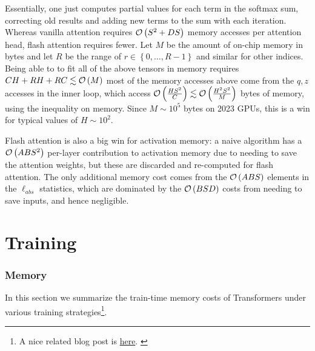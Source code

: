 \documentclass[11pt]{article}
\begin{document}
Essentially, one just computes partial values for each term in the softmax sum, correcting old
results and adding new terms to the sum with each iteration. Whereas vanilla attention requires $
\mathcal{O} \left( S ^{ 2 }+ DS \right)  $ memory accesses per attention head, flash attention requires
fewer. Let $ M $ be the amount of on-chip memory in bytes and let $ R  $ be the range of $ r \in
\left \{ 0, \ldots , R-1 \right \} $ and similar for other indices. Being able to to fit all of the
above tensors in memory requires $ CH + RH + RC \lesssim \mathcal{O} \left( M \right)  $ most of the memory
accesses above come from the $ q, z $ accesses in the inner loop, which access $ \mathcal{O} \left( \frac{
HS ^{ 2 } }{ C } \right)  \lesssim \mathcal{O} \left(\frac{ H ^{ 2}S ^{ 2 } }{ M }  \right) $ bytes of
memory, using the inequality on memory. Since $ M \sim 10 ^{ 5 } $ bytes on 2023 GPUs, this is a win
for typical values of $ H \sim 10 ^{ 2 } $.


Flash attention is also a big win for activation memory: a naive algorithm has a $ \mathcal{O} \left( ABS
^{ 2 } \right)  $ per-layer contribution to activation memory due to needing to save the attention
weights, but these are discarded and re-computed for flash attention.  The only additional memory
cost comes from the $ \mathcal{O} \left( ABS \right)  $ elements in the $ \ell _{ abs } $ statistics, which are
dominated by the $ \mathcal{O} \left( BSD \right)  $ costs from needing to save inputs, and hence negligible.

\newpage

\part{Training}

\section{Memory \label{sec_memory_training}}

In this section we summarize the train-time memory costs of Transformers under various training
strategies\footnote{A nice related blog post is \href{https://blog.eleuther.ai/transformer-math/}{here}. \label{foot_eleuther_math_101} }.
\end{document}
